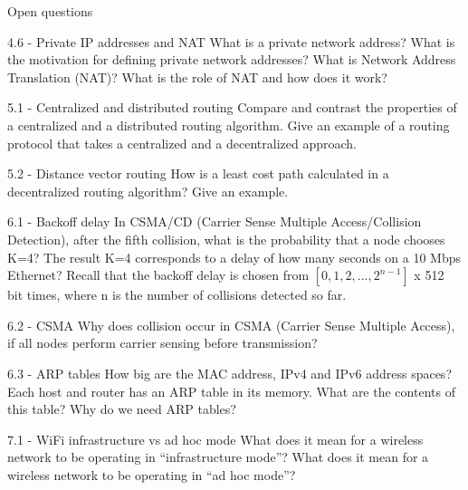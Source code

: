 \documentclass[a4paper]{article}
\begin{document}
\begin{quiz}{Open questions}
\begin{essay}[points=1]{4.6 - Private IP addresses and NAT}
What is a private network address? What is the motivation for defining private network addresses? What is Network Address Translation (NAT)? What is the role of NAT and how does it work?
\end{essay}


\begin{essay}[points=1]{5.1 - Centralized and distributed routing}
Compare and contrast the properties of a centralized and a distributed routing algorithm. Give an example of a routing protocol that takes a centralized and a decentralized approach.
\end{essay}

\begin{essay}[points=1]{5.2 - Distance vector routing}
How is a least cost path calculated in a decentralized routing algorithm? Give an example.
\end{essay}


\begin{essay}[points=1]{6.1 - Backoff delay}
In CSMA/CD (Carrier Sense Multiple Access/Collision Detection), after the fifth collision, what is the probability that a node chooses K=4? The result K=4 corresponds to a delay of how many seconds on a 10 Mbps Ethernet? Recall that the backoff delay is chosen from $[0, 1, 2, ... , 2^{n-1}]$ x 512 bit times, where n is the number of collisions detected so far.
\end{essay}

\begin{essay}[points=1]{6.2 - CSMA}
Why does collision occur in CSMA (Carrier Sense Multiple Access), if all nodes perform carrier sensing before transmission?
\end{essay}

\begin{essay}[points=1]{6.3 - ARP tables}
How big are the MAC address, IPv4 and IPv6 address spaces? Each host and router has an ARP table in its memory. What are the contents of this table? Why do we need ARP tables?
\end{essay}


\begin{essay}[points=1]{7.1 - WiFi infrastructure vs ad hoc mode}
What does it mean for a wireless network to be operating in ``infrastructure mode''? What does it mean for a wireless network to be operating in ``ad hoc mode''?
\end{essay}


\end{quiz}
\end{document}
